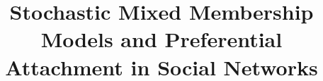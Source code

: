 \documentclass[numbib]{comnet}
\newcommand{\blind}{0}
\begin{document}



%

\title{Stochastic Mixed Membership Models and Preferential Attachment in Social Networks}

\author{%
\address{Univ. Grenoble Alpes, CNRS, Grenoble INP, LIG}
\address{Univ. Grenoble Alpes, CNRS, Grenoble INP, LIG}
\and
\address{Univ Lyon, UJM-Saint-Etienne, CNRS, Institut d’Optique Graduate School, LHC}
}
\end{document}
